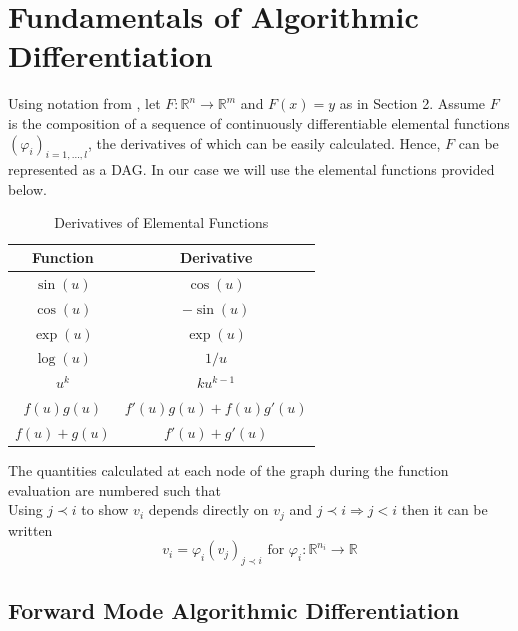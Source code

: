 \documentclass{article}
\begin{document}
\section{Fundamentals of Algorithmic Differentiation}

Using notation from  \cite{evald}, let $F: \mathbb{R}^n \rightarrow \mathbb{R}^m$ and $F(x) = y$ as in Section 2. Assume $F$ is the composition of a sequence of continuously differentiable elemental functions $(\varphi_i)_{i=1,\ldots, l}$, the derivatives of which can be easily calculated. Hence, $F$ can be represented as a DAG. In our case we will use the elemental functions provided below.

\begin{table}[h]
    \centering
    \begin{tabular}{|c|c|}
        \hline
        Function & Derivative \\
        \hline
        $\sin(u)$ & $\cos(u)$ \\
        $\cos(u)$ & $-\sin(u)$ \\
        $\exp(u) $ & $\exp(u)$ \\
        $\log(u)$ & $1/u$ \\
        $u^k$ & $k u^{k-1}$ \\
        $f(u)g(u)$ & $f'(u)g(u) + f(u)g'(u)$ \\
        $f(u) + g(u)$ & $f'(u) + g'(u)$ \\
        \hline
    \end{tabular}
    \caption{Derivatives of Elemental Functions}
    \label{tab:elemental}
\end{table}

The quantities calculated at each node of the graph during the function evaluation are numbered such that
\begin{equation*}
    [ \underbrace{v_{1-n}, \ldots, v_0}_{x} , v_1, \ldots, v_{l-m}, \underbrace{v_{l-m+1}, \ldots, v_l}_{y}]
\end{equation*}
Using $j \prec i$ to show $v_i$ depends directly on $v_j$ and $j \prec i \Longrightarrow j < i$ then it can be written
\begin{equation*}
    v_i = \varphi_i (v_j)_{j \prec i} \text{ for } \varphi_i : \mathbb{R}^{n_i} \longrightarrow \mathbb{R}
\end{equation*}

\subsection{Forward Mode Algorithmic Differentiation}
\end{document}
